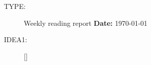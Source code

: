 \documentclass[12pt]{article}
\begin{document}
\thispagestyle{empty}

\begin{description}
\item[TYPE:] Weekly reading report  \hfill {\bf Date:} \today
\item[IDEA1:] [] 
\end{description}





\end{document}
